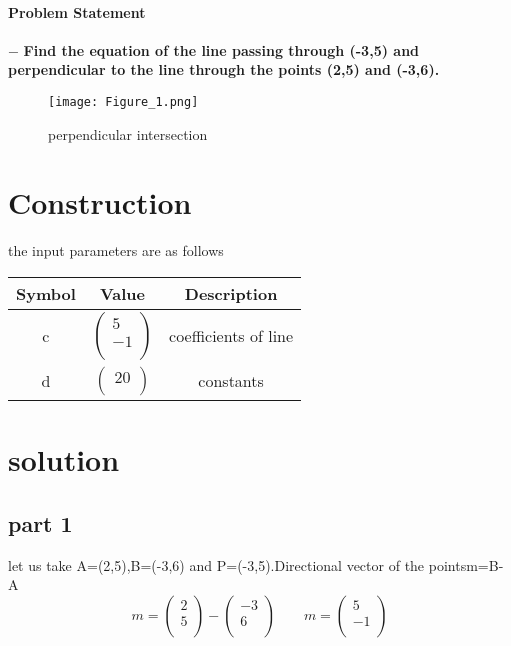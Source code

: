 \documentclass[10pt, a4paper]{article}
\title{\mytitle}
\author{\myauthor\hspace{1em}\\\contact\\FWC22069\hspace{6.5em}IITH\hspace{0.5em}\mymodule\hspace{6em}ASSIGN-4}
\date{}
\begin{document}
	\maketitle
 \paragraph*{\large Problem Statement}
$-$ \textbf{ Find the equation of the line passing through  (-3,5) and perpendicular to the line through the points (2,5) and (-3,6).}
 
\begin{figure}[h]
\centering
\texttt{[image: Figure\_1.png]}
\caption{perpendicular intersection}
\end{figure}
	\section*{Construction}
\vspace{2mm}
 the input parameters are as follows
{
\setlength\extrarowheight{4pt}
 
 \begin{tabular}{|c|c|c|}
	\hline
	\textbf{Symbol}&\textbf{Value}&\textbf{Description}\\
	\hline
 c&$
	\begin{pmatrix}
		5\\
		-1\\
	\end{pmatrix}$
	&coefficients of line \\
	\hline
 d&$
	\begin{pmatrix}
		20\\
	\end{pmatrix}$
	&constants\\
	\hline
 \end{tabular}
}
\section*{\large solution}

\subsection*{\large part 1}
let us take A=(2,5),B=(-3,6) and P=(-3,5).Directional vector  of the points\vspace{4mm}m=B-A\\
\begin{equation}
m=\begin{pmatrix}
    2\\
    5\\
\end{pmatrix}-\begin{pmatrix}
    -3\\
    6\\
\end{pmatrix}\hspace{2em}
m=\begin{pmatrix}
    5\\
    -1\\
\end{pmatrix}
\label{eq-1}
\end{equation}
\end{document}
